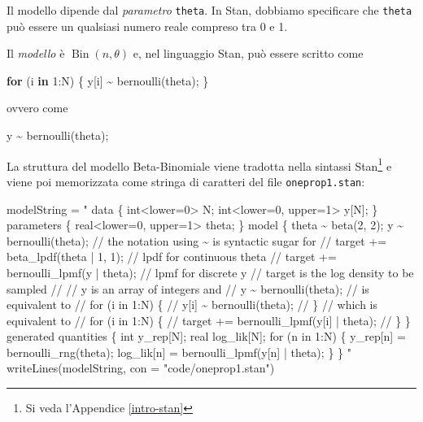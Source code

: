 \documentclass[
  10pt,
  italian,
  a4paper,
  extrafontsizes,onecolumn,openright
  ]{memoir}
\newenvironment{Shaded}{\begin{snugshade}}{\end{snugshade}}
\newcommand{\AttributeTok}[1]{\textcolor[rgb]{0.77,0.63,0.00}{#1}}
\newcommand{\ControlFlowTok}[1]{\textcolor[rgb]{0.13,0.29,0.53}{\textbf{#1}}}
\newcommand{\DecValTok}[1]{\textcolor[rgb]{0.00,0.00,0.81}{#1}}
\newcommand{\FunctionTok}[1]{\textcolor[rgb]{0.00,0.00,0.00}{#1}}
\newcommand{\NormalTok}[1]{#1}
\newcommand{\OtherTok}[1]{\textcolor[rgb]{0.56,0.35,0.01}{#1}}
\newcommand{\SpecialCharTok}[1]{\textcolor[rgb]{0.00,0.00,0.00}{#1}}
\newcommand{\StringTok}[1]{\textcolor[rgb]{0.31,0.60,0.02}{#1}}
\DeclareMathOperator{\Bin}{Bin} %
\begin{document}
Il modello dipende dal \emph{parametro} \texttt{theta}. In Stan, dobbiamo specificare che \texttt{theta} può essere un qualsiasi numero reale compreso tra 0 e 1.

Il \emph{modello} è \(\Bin(n, \theta)\) e, nel linguaggio Stan, può essere scritto come

\begin{Shaded}
\begin{Highlighting}[]
\ControlFlowTok{for}\NormalTok{ (i }\ControlFlowTok{in} \DecValTok{1}\SpecialCharTok{:}\NormalTok{N) \{}
\NormalTok{  y[i] }\SpecialCharTok{\textasciitilde{}} \FunctionTok{bernoulli}\NormalTok{(theta);}
\NormalTok{\}}
\end{Highlighting}
\end{Shaded}

\noindent
ovvero come

\begin{Shaded}
\begin{Highlighting}[]
\NormalTok{y }\SpecialCharTok{\textasciitilde{}} \FunctionTok{bernoulli}\NormalTok{(theta);}
\end{Highlighting}
\end{Shaded}

La struttura del modello Beta-Binomiale viene tradotta nella sintassi Stan\footnote{Si veda l'Appendice \ref{intro-stan}} e viene poi memorizzata come stringa di caratteri del file \texttt{oneprop1.stan}:

\begin{Shaded}
\begin{Highlighting}[]
\NormalTok{modelString }\OtherTok{=} \StringTok{"}
\StringTok{data \{}
\StringTok{  int\textless{}lower=0\textgreater{} N;}
\StringTok{  int\textless{}lower=0, upper=1\textgreater{} y[N];}
\StringTok{\}}
\StringTok{parameters \{}
\StringTok{  real\textless{}lower=0, upper=1\textgreater{} theta;}
\StringTok{\}}
\StringTok{model \{}
\StringTok{  theta \textasciitilde{} beta(2, 2);}
\StringTok{  y \textasciitilde{} bernoulli(theta);}
\StringTok{  // the notation using \textasciitilde{} is syntactic sugar for}
\StringTok{  //  target += beta\_lpdf(theta | 1, 1);   // lpdf for continuous theta}
\StringTok{  //  target += bernoulli\_lpmf(y | theta); // lpmf for discrete y}
\StringTok{  // target is the log density to be sampled}
\StringTok{  //}
\StringTok{  // y is an array of integers and}
\StringTok{  //  y \textasciitilde{} bernoulli(theta);}
\StringTok{  // is equivalent to}
\StringTok{  //  for (i in 1:N) \{}
\StringTok{  //    y[i] \textasciitilde{} bernoulli(theta);}
\StringTok{  //  \}}
\StringTok{  // which is equivalent to}
\StringTok{  //  for (i in 1:N) \{}
\StringTok{  //    target += bernoulli\_lpmf(y[i] | theta); }
\StringTok{  //  \}}
\StringTok{\}}
\StringTok{generated quantities \{}
\StringTok{  int y\_rep[N];}
\StringTok{  real log\_lik[N];}
\StringTok{  for (n in 1:N) \{}
\StringTok{    y\_rep[n] = bernoulli\_rng(theta);}
\StringTok{    log\_lik[n] = bernoulli\_lpmf(y[n] | theta);}
\StringTok{  \}}
\StringTok{\}}
\StringTok{"}
\FunctionTok{writeLines}\NormalTok{(modelString, }\AttributeTok{con =} \StringTok{"code/oneprop1.stan"}\NormalTok{)}
\end{Highlighting}
\end{Shaded}
\end{document}
